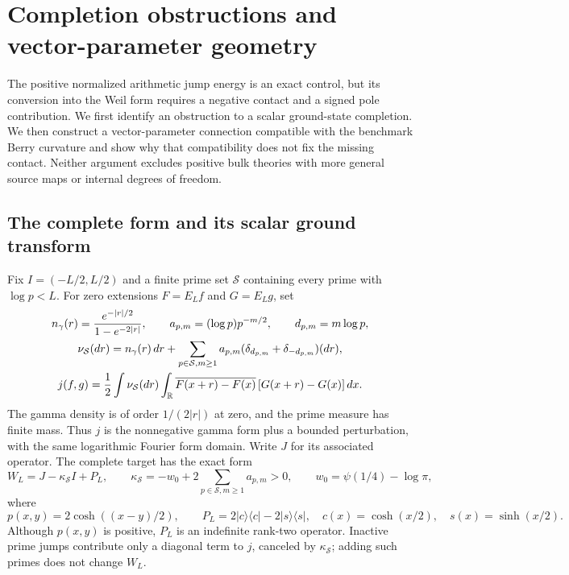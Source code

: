 \section{Completion obstructions and vector-parameter geometry}
\label{obs-section}

The positive normalized arithmetic jump energy is an exact control, but its
conversion into the Weil form requires a negative contact and a signed pole
contribution.  We first identify an obstruction to a scalar ground-state
completion.  We then construct a vector-parameter connection compatible with
the benchmark Berry curvature and show why that compatibility does not fix the
missing contact.  Neither argument excludes positive bulk theories with more
general source maps or internal degrees of freedom.

\subsection{The complete form and its scalar ground transform}

Fix $I=(-L/2,L/2)$ and a finite prime set $\mathcal S$ containing every prime
with $\log p<L$.  For zero extensions $F=E_Lf$ and $G=E_Lg$, set
\begin{gather}
 n_\gamma(r)=\frac{e^{-|r|/2}}{1-e^{-2|r|}},\qquad
 a_{p,m}=(\log p)p^{-m/2},\qquad d_{p,m}=m\log p,\nonumber\\
 \nu_{\mathcal S}(dr)=n_\gamma(r)\,dr+
 \sum_{p\in\mathcal S,m\ge1}a_{p,m}
       (\delta_{d_{p,m}}+\delta_{-d_{p,m}})(dr),\label{obs-jump-measure}\\
 j(f,g)=\frac12\int\nu_{\mathcal S}(dr)\int_\mathbb R
 \overline{F(x+r)-F(x)}\,[G(x+r)-G(x)]\,dx.\label{obs-jump-form}
\end{gather}
The gamma density is of order $1/(2|r|)$ at zero, and the prime measure has
finite mass.  Thus $j$ is the nonnegative gamma form plus a bounded
perturbation, with the same logarithmic Fourier form domain.  Write $J$ for
its associated operator.  The complete target has the exact form
\begin{equation}
 W_L=J-\kappa_{\mathcal S}I+P_L,
 \qquad \kappa_{\mathcal S}=-w_0+2\sum_{p\in\mathcal S,m\ge1}a_{p,m}>0,
 \qquad w_0=\psi(1/4)-\log\pi,
 \label{obs-full-operator}
\end{equation}
where
\begin{equation}
 p(x,y)=2\cosh((x-y)/2),\qquad
 P_L=2|c\rangle\langle c|-2|s\rangle\langle s|,
 \quad c(x)=\cosh(x/2),\quad s(x)=\sinh(x/2).
 \label{obs-pole-kernel}
\end{equation}
Although $p(x,y)$ is positive, $P_L$ is an indefinite rank-two operator.
Inactive prime jumps contribute only a diagonal term to $j$, canceled by
$\kappa_{\mathcal S}$; adding such primes does not change $W_L$.

